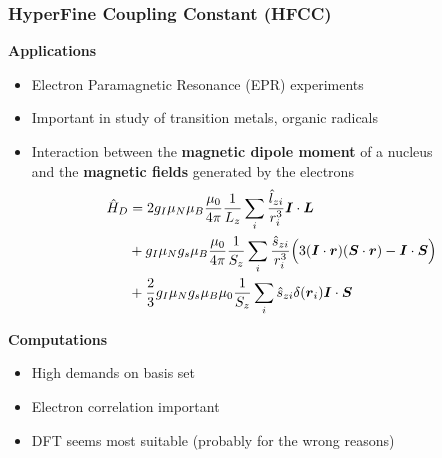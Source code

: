 \begin{frame}
\frametitle{HyperFine Coupling Constant (HFCC)}
\scriptsize

\textbf{Applications}
\begin{itemize}
\item Electron Paramagnetic Resonance (EPR) experiments
\item Important in study of transition metals, organic radicals
\item Interaction between the \textbf{magnetic dipole moment} of a nucleus\\
      and the \textbf{magnetic fields} generated by the electrons 
\pause
\begin{align}
    \nonumber
    \hat{H}_D &= 2g_I\mu_N\mu_B\frac{\mu_0}{4\pi}\frac{1}{L_z}\sum_i\frac{\hat{l}_{zi}}{r_i^3}\boldsymbol I\cdot\boldsymbol L\\
    \nonumber
              &+ g_I\mu_Ng_s\mu_B\frac{\mu_0}{4\pi}\frac{1}{S_z}\sum_i\frac{\hat{s}_{zi}}{r_i^3}\Big(3(\boldsymbol I\cdot\boldsymbol r)(\boldsymbol S\cdot\boldsymbol r)-\boldsymbol I\cdot\boldsymbol S\Big)\\
    \nonumber
              &+ \frac{2}{3}g_I\mu_Ng_s\mu_B\mu_0\frac{1}{S_z}\sum_i\hat{s}_{zi}\delta(\boldsymbol r_i)\boldsymbol I\cdot\boldsymbol S
\end{align}
\end{itemize}


\pause
\textbf{Computations}
\begin{itemize}
\item High demands on basis set
\item Electron correlation important
\item DFT seems most suitable (probably for the wrong reasons)
\end{itemize}

\end{frame}

